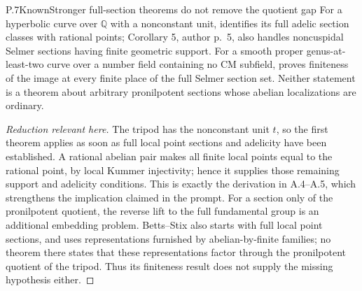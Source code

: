 \begin{result}{P.7}{Known}{Stronger full-section theorems do not remove the quotient gap}
For a hyperbolic curve over \(\mathbb Q\) with a nonconstant unit,
\citet[Corollary 6, author p.~6]{Stix2015} identifies its full adelic
section classes with rational points; Corollary 5, author p.~5, also
handles noncuspidal Selmer sections having finite geometric support.
For a smooth proper genus-at-least-two curve over a number field containing
no CM subfield, \citet[Theorem A and Definition 1.1,
author p.~1]{LitBettsStix2025} proves finiteness of the image at every
finite place of the full Selmer section set.
Neither statement is a theorem about arbitrary pronilpotent sections
whose abelian localizations are ordinary.
\end{result}
\begin{proof}[Reduction relevant here]
The tripod has the nonconstant unit \(t\), so the first theorem applies
as soon as full local point sections and adelicity have been established.
A rational abelian pair makes all finite local points equal to the
rational point, by local Kummer injectivity; hence it supplies those
remaining support and adelicity conditions. This is exactly the
derivation in A.4--A.5, which strengthens the implication claimed in the
prompt. For a section only of the pronilpotent quotient, the reverse
lift to the full fundamental group is an additional embedding problem.
Betts--Stix also starts with full local point sections, and uses
representations furnished by abelian-by-finite families; no theorem there
states that these representations factor through the pronilpotent
quotient of the tripod. Thus its finiteness result does not supply the
missing hypothesis either.
\end{proof}

